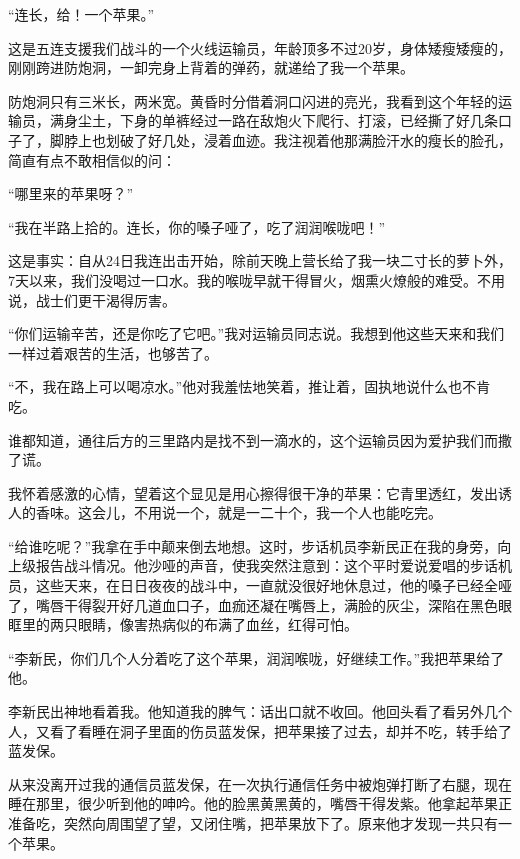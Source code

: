 \documentclass[12pt,UTF-8,openany]{ctexbook}
\begin{document}
\begin{large}
    
    “连长，给！一个苹果。”
    
    这是五连支援我们战斗的一个火线运输员，年龄顶多不过20岁，身体矮瘦矮瘦的，刚刚跨进防炮洞，一卸完身上背着的弹药，就递给了我一个苹果。
    
    防炮洞只有三米长，两米宽。黄昏时分借着洞口闪进的亮光，我看到这个年轻的运输员，满身尘土，下身的单裤经过一路在敌炮火下爬行、打滚，已经撕了好几条口子了，脚脖上也划破了好几处，浸着血迹。我注视着他那满脸汗水的瘦长的脸孔，简直有点不敢相信似的问：
    
    “哪里来的苹果呀？”
    
    “我在半路上拾的。连长，你的嗓子哑了，吃了润润喉咙吧！”
    
    这是事实：自从24日我连出击开始，除前天晚上营长给了我一块二寸长的萝卜外，7天以来，我们没喝过一口水。我的喉咙早就干得冒火，烟熏火燎般的难受。不用说，战士们更干渴得厉害。
    
    “你们运输辛苦，还是你吃了它吧。”我对运输员同志说。我想到他这些天来和我们一样过着艰苦的生活，也够苦了。
    
    “不，我在路上可以喝凉水。”他对我羞怯地笑着，推让着，固执地说什么也不肯吃。
    
    谁都知道，通往后方的三里路内是找不到一滴水的，这个运输员因为爱护我们而撒了谎。
    
    我怀着感激的心情，望着这个显见是用心擦得很干净的苹果：它青里透红，发出诱人的香味。这会儿，不用说一个，就是一二十个，我一个人也能吃完。
    
    “给谁吃呢？”我拿在手中颠来倒去地想。这时，步话机员李新民正在我的身旁，向上级报告战斗情况。他沙哑的声音，使我突然注意到：这个平时爱说爱唱的步话机员，这些天来，在日日夜夜的战斗中，一直就没很好地休息过，他的嗓子已经全哑了，嘴唇干得裂开好几道血口子，血痂还凝在嘴唇上，满脸的灰尘，深陷在黑色眼眶里的两只眼睛，像害热病似的布满了血丝，红得可怕。
    
    “李新民，你们几个人分着吃了这个苹果，润润喉咙，好继续工作。”我把苹果给了他。
    
    李新民出神地看着我。他知道我的脾气：话出口就不收回。他回头看了看另外几个人，又看了看睡在洞子里面的伤员蓝发保，把苹果接了过去，却并不吃，转手给了蓝发保。
    
    从来没离开过我的通信员蓝发保，在一次执行通信任务中被炮弹打断了右腿，现在睡在那里，很少听到他的呻吟。他的脸黑黄黑黄的，嘴唇干得发紫。他拿起苹果正准备吃，突然向周围望了望，又闭住嘴，把苹果放下了。原来他才发现一共只有一个苹果。
    

\end{large}
\end{document}
